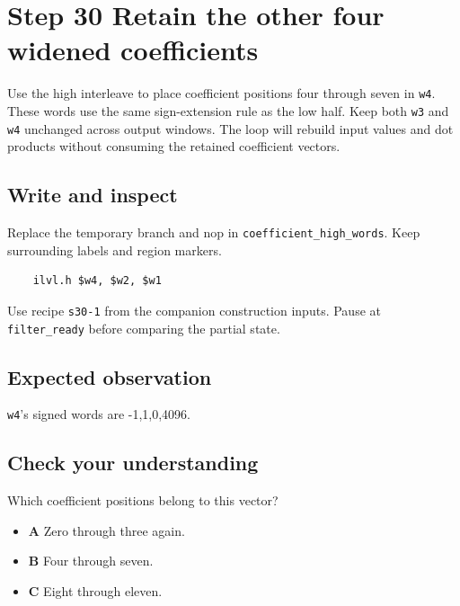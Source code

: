\section{Step 30 Retain the other four widened coefficients}\label{fir-s30}

Use the high interleave to place coefficient positions four through seven in \texttt{w4}. These words use the same sign-extension rule as the low half. Keep both \texttt{w3} and \texttt{w4} unchanged across output windows. The loop will rebuild input values and dot products without consuming the retained coefficient vectors.

\subsection{Write and inspect}
Replace the temporary branch and nop in \texttt{coefficient\_high\_words}. Keep surrounding labels and region markers.

\begin{verbatim}
    ilvl.h $w4, $w2, $w1
\end{verbatim}
Use recipe \texttt{s30-1} from the companion construction inputs. Pause at \texttt{filter\_ready} before comparing the partial state.

\subsection{Expected observation}
\texttt{w4}’s signed words are -1,1,0,4096.

\subsection{Check your understanding}
Which coefficient positions belong to this vector?

\begin{itemize}
  \item \textbf{A} Zero through three again.
  \item \textbf{B} Four through seven.
  \item \textbf{C} Eight through eleven.
\end{itemize}
